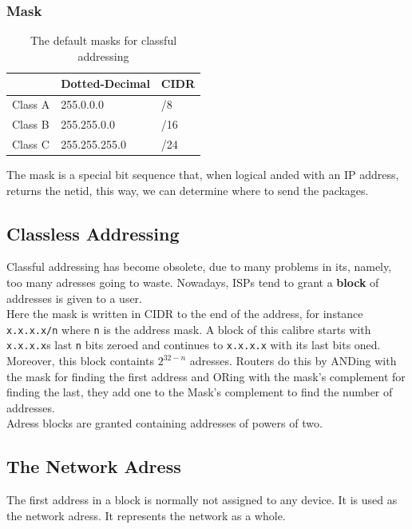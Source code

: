 \documentclass[11pt,a4paper,twoside]{book}
\begin{document}
\subsubsection{Mask}

\begin{table}
\begin{tabular}{lll}
\toprule
& Dotted-Decimal & CIDR \\
\midrule
Class A & 255.0.0.0  & /8\\
Class B & 255.255.0.0 & /16 \\ 
Class C & 255.255.255.0& /24 \\
\bottomrule
\end{tabular}
\caption{The default masks for classful addressing}
\end{table}

The mask is a special bit sequence that, when logical anded with an IP address, returns the netid, this way, we can determine where to send the packages.

\subsection{Classless Addressing}

Classful addressing has become obsolete, due to many problems in its, namely, too many adresses going to waste. Nowadays, ISPs tend to grant a \textbf{block} of addresses is given to a user.\\

Here the mask is written in CIDR to the end of the address, for instance \texttt{x.x.x.x/n} where \texttt{n} is the address mask. A block of this calibre starts with \texttt{x.x.x.x}s last \texttt{n} bits zeroed and continues to \texttt{x.x.x.x} with its last bits oned. Moreover, this block containts $2^{32 - n}$ adresses. Routers do this by ANDing with the mask for finding the first address and ORing with the mask's complement for finding the last, they add one to the Mask's complement to find the number of addresses.\\

Adress blocks are granted containing addresses of powers of two.\\

\subsection{The Network Adress}

The first address in a block is normally not assigned to any device. It is used as the network adress. It represents the network as a whole.
\end{document}
